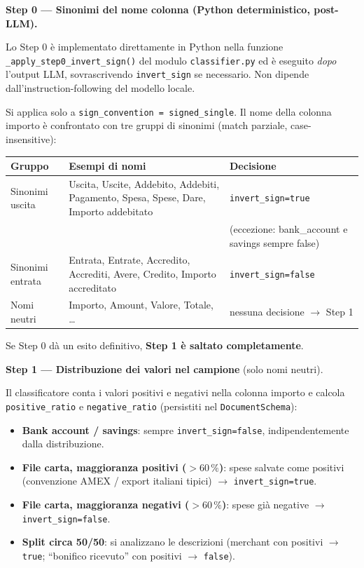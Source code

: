 \documentclass[11pt, a4paper]{article}
\begin{document}
\begin{newbox}
\textbf{Step 0 --- Sinonimi del nome colonna (Python deterministico, post-LLM).}

Lo Step 0 è implementato direttamente in Python nella funzione
\texttt{\_apply\_step0\_invert\_sign()} del modulo \texttt{classifier.py} ed è eseguito
\emph{dopo} l'output LLM, sovrascrivendo \texttt{invert\_sign} se necessario.
Non dipende dall'instruction-following del modello locale.

Si applica solo a \texttt{sign\_convention = signed\_single}. Il nome della colonna
importo è confrontato con tre gruppi di sinonimi (match parziale, case-insensitive):

\begin{center}
\small
\begin{tabular}{@{}L{3.2cm} L{6cm} L{3.5cm}@{}}
\toprule
\textbf{Gruppo} & \textbf{Esempi di nomi} & \textbf{Decisione} \\
\midrule
Sinonimi uscita  & Uscita, Uscite, Addebito, Addebiti, Pagamento,
                   Spesa, Spese, Dare, Importo addebitato
                 & \texttt{invert\_sign=true}\\
                 & & (eccezione: bank\_account e savings sempre false) \\[3pt]
Sinonimi entrata & Entrata, Entrate, Accredito, Accrediti, Avere,
                   Credito, Importo accreditato
                 & \texttt{invert\_sign=false} \\[3pt]
Nomi neutri      & Importo, Amount, Valore, Totale, \dots
                 & nessuna decisione $\to$ Step 1 \\
\bottomrule
\end{tabular}
\end{center}

Se Step 0 dà un esito definitivo, \textbf{Step 1 è saltato completamente}.
\end{newbox}

\textbf{Step 1 --- Distribuzione dei valori nel campione} (solo nomi neutri).

Il classificatore conta i valori positivi e negativi nella colonna importo e calcola
\texttt{positive\_ratio} e \texttt{negative\_ratio} (persistiti nel \texttt{DocumentSchema}):

\begin{itemize}[leftmargin=2em]
  \item \textbf{Bank account / savings}: sempre \texttt{invert\_sign=false},
        indipendentemente dalla distribuzione.
  \item \textbf{File carta, maggioranza positivi ($> 60\,\%$)}: spese salvate come
        positivi (convenzione AMEX / export italiani tipici) $\to$ \texttt{invert\_sign=true}.
  \item \textbf{File carta, maggioranza negativi ($> 60\,\%$)}: spese già negative
        $\to$ \texttt{invert\_sign=false}.
  \item \textbf{Split circa 50/50}: si analizzano le descrizioni (merchant con positivi
        $\to$ \texttt{true}; ``bonifico ricevuto'' con positivi $\to$ \texttt{false}).
\end{itemize}
\end{document}
